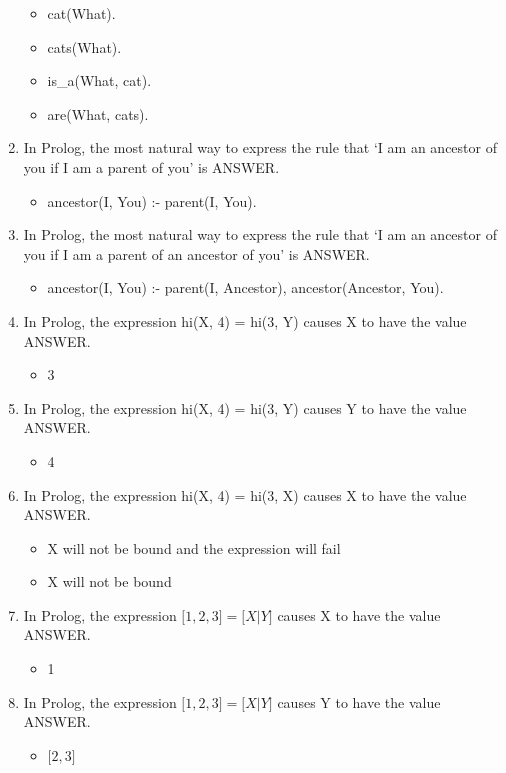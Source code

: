 \documentclass{exam}
\begin{document}
\begin{enumerate}
\begin{itemize}
\item cat(What).
\item cats(What).
\item is\_a(What, cat).
\item are(What, cats).
\end{itemize}
\item In Prolog, the most natural way to express the rule that `I am an ancestor of you if I am a parent of you' is ANSWER.
\begin{itemize}
\item ancestor(I, You) :- parent(I, You).
\end{itemize}
\item In Prolog, the most natural way to express the rule that `I am an ancestor of you if I am a parent of an ancestor of you' is ANSWER.
\begin{itemize}
\item ancestor(I, You) :- parent(I, Ancestor), ancestor(Ancestor, You). 
\end{itemize}
\item In Prolog, the expression hi(X, 4) = hi(3, Y) causes X to have the value ANSWER.
\begin{itemize}
\item 3
\end{itemize}
\item In Prolog, the expression hi(X, 4) = hi(3, Y) causes Y to have the value ANSWER.
\begin{itemize}
\item 4
\end{itemize}
\item In Prolog, the expression hi(X, 4) = hi(3, X) causes X to have the value ANSWER.
\begin{itemize}
\item X will not be bound and the expression will fail
\item X will not be bound
\end{itemize}
\item In Prolog, the expression $\lbrack 1, 2, 3\rbrack = \lbrack X | Y\rbrack$ causes X to have the value ANSWER.
\begin{itemize}
\item 1
\end{itemize}
\item In Prolog, the expression $\lbrack 1, 2, 3\rbrack = \lbrack X | Y\rbrack$ causes Y to have the value ANSWER.
\begin{itemize}
\item $\lbrack 2, 3\rbrack$

\end{itemize}
\end{enumerate}
\end{document}
